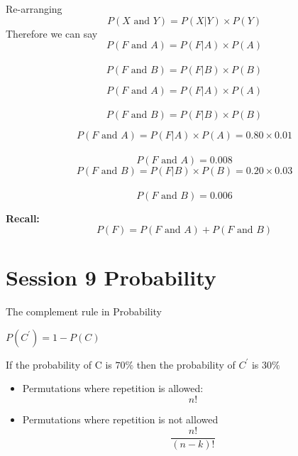 \documentclass[12pt]{report}
\begin{document}
		Re-arranging
		\[ P(X \mbox{ and } Y) =  P(X|Y)\times P(Y) \]
		Therefore we can say
		\[ P(F \mbox{ and } A) =  P(F|A)\times P(A) \]\\
		\[ P(F \mbox{ and } B) =  P(F|B)\times P(B) \]
		
		
		
		\Large
		\vspace{-1.5cm}
		\[ P(F \mbox{ and } A) =  P(F|A)\times P(A) \]\\
		\vspace{1.7cm}
		\[ P(F \mbox{ and } B) =  P(F|B)\times P(B) \]
		
		
		
		\Large
		\[ P(F \mbox{ and } A) =  P(F|A)\times P(A) = 0.80 \times 0.01\]\\
		\[ P(F \mbox{ and } A) = 0.008\]
		\bigskip
		\[ P(F \mbox{ and } B) =  P(F|B)\times P(B) = 0.20 \times 0.03\]\\
		\[ P(F \mbox{ and } B) = 0.006\]
		
		\textbf{Recall:}
		\[ P(F) = P(F \mbox{ and } A) + P(F \mbox{ and } B) \]
		
		
		
		\section*{Session 9 Probability}

		
		
		The complement rule in Probability
		
		$P(C^{\prime}) = 1- P(C)$
		
		
		
		If the probability of C is $70 \%$ then the probability of $C^{\prime}$ is $30\%$
		
		
		\newpage


\large
\begin{itemize}
	\item Permutations where repetition is allowed: 
	\[ n! \]
	\item Permutations where repetition is not allowed
	\[ \frac{n!}{(n-k)!} \]
	\end{itemize}
	
	
	
\end{document}

